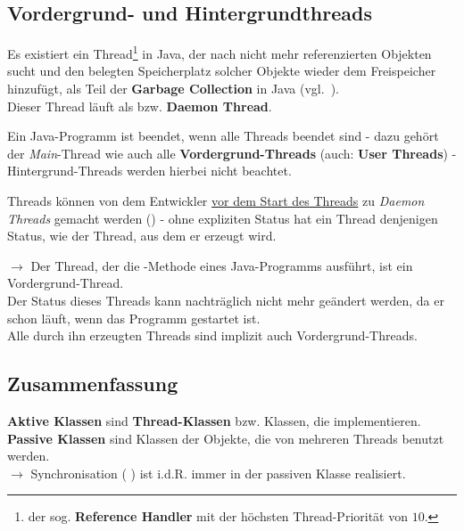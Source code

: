 \subsection{Vordergrund- und Hintergrundthreads}

Es existiert ein Thread\footnote{
der sog. \textbf{Reference Handler} mit der höchsten Thread-Priorität von $10$.
} in Java, der nach nicht mehr referenzierten Objekten sucht und den belegten Speicherplatz solcher Objekte wieder dem Freispeicher hinzufügt, als Teil der \textbf{Garbage Collection} in Java (vgl.~\cite[88]{Oec22}).\\
\noindent
Dieser Thread läuft als  bzw. \textbf{Daemon Thread}.

\begin{tcolorbox}[enlarge top by=0.5cm,enlarge bottom by=0.5cm]
Ein Java-Programm ist beendet, wenn alle Threads beendet sind - dazu gehört der \textit{Main}-Thread wie auch alle \textbf{Vordergrund-Threads} (auch: \textbf{User Threads}) - Hintergrund-Threads werden hierbei nicht beachtet.\\
\end{tcolorbox}

\noindent
Threads können von dem Entwickler \ul{vor dem Start des Threads} zu \textit{Daemon Threads} gemacht werden () - ohne expliziten Status hat ein Thread denjenigen Status, wie der Thread, aus dem er erzeugt wird.

\noindent
$\rightarrow$ Der Thread, der die -Methode eines Java-Programms ausführt, ist ein Vordergrund-Thread.\\
Der Status dieses Threads kann nachträglich nicht mehr geändert werden, da er schon läuft, wenn das Programm gestartet ist.\\
Alle durch ihn erzeugten Threads sind implizit auch Vordergrund-Threads.

\subsection{Zusammenfassung}

\textbf{Aktive Klassen} sind \textbf{Thread-Klassen} bzw. Klassen, die  implementieren.\\

\noindent
\textbf{Passive Klassen} sind Klassen der Objekte, die von mehreren Threads benutzt werden.\\

$\rightarrow$ Synchronisation ( ) ist i.d.R. immer in der passiven Klasse realisiert.